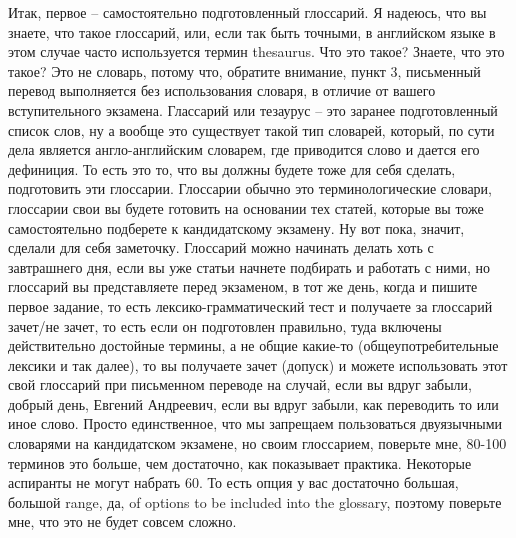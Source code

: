 \documentclass[main.tex]{subfiles}
\begin{document}
 Итак, первое -- самостоятельно подготовленный глоссарий.
 Я надеюсь, что вы знаете, что такое глоссарий, или, если так быть точными, в английском языке в этом случае часто используется термин thesaurus.
Что это такое?
Знаете, что это такое?
Это не словарь, потому что, обратите внимание, пункт 3, письменный перевод выполняется без использования словаря, в отличие от вашего вступительного экзамена.
Глассарий или тезаурус -- это заранее подготовленный список слов, ну а вообще это существует такой тип словарей, который, по сути дела является англо-английским словарем, где приводится слово и дается его дефиниция.
То есть это то, что вы должны будете тоже для себя сделать, подготовить эти глоссарии.
Глоссарии обычно это терминологические словари, глоссарии свои вы будете готовить на основании тех статей, которые вы тоже самостоятельно подберете к кандидатскому экзамену.
Ну вот пока, значит, сделали для себя заметочку.
Глоссарий можно начинать делать хоть с завтрашнего дня, если вы уже статьи начнете подбирать и работать с ними, но глоссарий вы представляете перед экзаменом, в тот же день, когда и пишите первое задание, то есть лексико-грамматический тест и получаете за глоссарий зачет/не зачет, то есть если он подготовлен правильно, туда включены действительно достойные термины, а не общие какие-то (общеупотребительные лексики и так далее), то вы получаете зачет (допуск) и можете использовать этот свой глоссарий при письменном переводе на случай, если вы вдруг забыли, добрый день, Евгений Андреевич, если вы вдруг забыли, как переводить то или иное слово.
Просто единственное, что мы запрещаем пользоваться двуязычными словарями на кандидатском экзамене, но своим глоссарием, поверьте мне, 80-100 терминов это больше, чем достаточно, как показывает практика.
Некоторые аспиранты не могут набрать 60.
То есть опция у вас достаточно большая, большой range, да, of options to be included into the glossary, поэтому поверьте мне, что это не будет совсем сложно.
\end{document}
